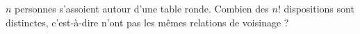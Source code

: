 $n$ personnes s'assoient autour d'une table ronde. Combien des $n!$ dispositions sont distinctes, c'est-à-dire n'ont pas les mêmes relations de voisinage ?
